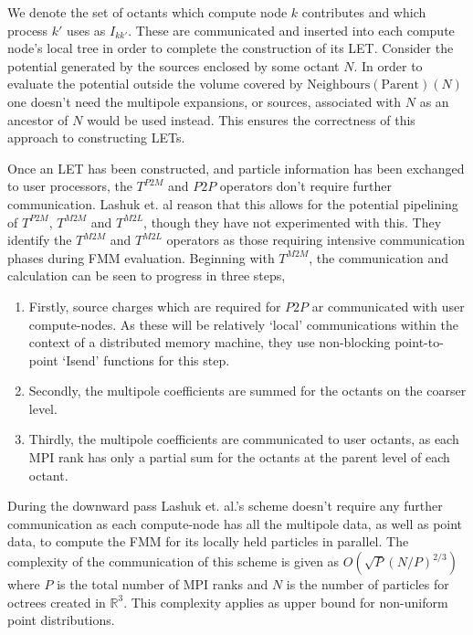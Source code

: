 We denote the set of octants which compute node $k$ contributes and which process $k'$ uses as $I_{k k'}$. These are communicated and inserted into each compute node's local tree in order to complete the construction of its LET. Consider the potential generated by the sources enclosed by some octant $N$. In order to evaluate the potential outside the volume covered by $\text{Neighbours}(\text{Parent})(N)$ one doesn't need the multipole expansions, or sources, associated with $N$ as an ancestor of $N$ would be used instead. This ensures the correctness of this approach to constructing LETs.

Once an LET has been constructed, and particle information has been exchanged to user processors, the $T^{P2M}$ and $P2P$ operators don't require further communication. Lashuk et. al reason that this allows for the potential pipelining of $T^{P2M}$, $T^{M2M}$ and $T^{M2L}$, though they have not experimented with this. They identify the $T^{M2M}$ and $T^{M2L}$ operators as those requiring intensive communication phases during FMM evaluation. Beginning with $T^{M2M}$, the communication and calculation can be seen to progress in three steps,

\begin{enumerate}
    \item Firstly, source charges which are required for $P2P$ ar communicated with user compute-nodes. As these will be relatively `local' communications within the context of a distributed memory machine, they use non-blocking point-to-point `Isend' functions for this step.
    \item Secondly, the multipole coefficients are summed for the octants on the coarser level.
    \item Thirdly, the multipole coefficients are communicated to user octants, as each MPI rank has only a partial sum for the octants at the parent level of each octant.
\end{enumerate}

During the downward pass Lashuk et. al.'s scheme doesn't require any further communication as each compute-node has all the multipole data, as well as point data, to compute the FMM for its locally held particles in parallel. The complexity of the communication of this scheme is given as $O(\sqrt{P}(N/P)^{2/3})$ where $P$ is the total number of MPI ranks and $N$ is the number of particles for octrees created in $\mathbb{R}^3$. This complexity applies as upper bound for non-uniform point distributions.

